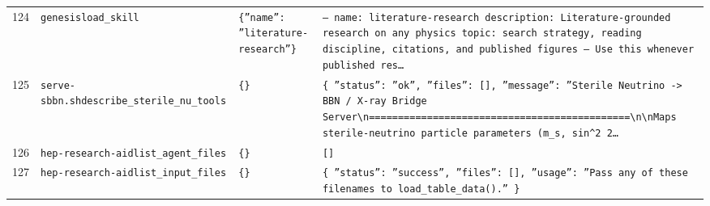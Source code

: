 \documentclass[11pt,a4paper]{article}
\begin{document}
\begin{longtable}{@{}p{}p{}p{}p{}@{}}
124 & \texttt{genesis}\newline\texttt{load\_\allowbreak{}skill} & \texttt{\{''name'':\allowbreak{} ''literature-research''\}\allowbreak{}} & \texttt{--- name:\allowbreak{} literature-research description:\allowbreak{} Literature-grounded research on any physics topic:\allowbreak{} search strategy,\allowbreak{} reading discipline,\allowbreak{} citations,\allowbreak{} and published figures ---  Use this whenever published res\ldots{}\allowbreak{}} \\
125 & \texttt{serve-sbbn.sh}\newline\texttt{describe\_\allowbreak{}sterile\_\allowbreak{}nu\_\allowbreak{}tools} & \texttt{\{\}\allowbreak{}} & \texttt{\{   ''status'':\allowbreak{} ''ok'',\allowbreak{}   ''files'':\allowbreak{} []\allowbreak{},\allowbreak{}   ''message'':\allowbreak{} ''Sterile Neutrino -\textgreater{}\allowbreak{} BBN /\allowbreak{} X-ray Bridge Server\textbackslash{}\allowbreak{}n=\allowbreak{}=\allowbreak{}=\allowbreak{}=\allowbreak{}=\allowbreak{}=\allowbreak{}=\allowbreak{}=\allowbreak{}=\allowbreak{}=\allowbreak{}=\allowbreak{}=\allowbreak{}=\allowbreak{}=\allowbreak{}=\allowbreak{}=\allowbreak{}=\allowbreak{}=\allowbreak{}=\allowbreak{}=\allowbreak{}=\allowbreak{}=\allowbreak{}=\allowbreak{}=\allowbreak{}=\allowbreak{}=\allowbreak{}=\allowbreak{}=\allowbreak{}=\allowbreak{}=\allowbreak{}=\allowbreak{}=\allowbreak{}=\allowbreak{}=\allowbreak{}=\allowbreak{}=\allowbreak{}=\allowbreak{}=\allowbreak{}=\allowbreak{}=\allowbreak{}=\allowbreak{}=\allowbreak{}=\allowbreak{}=\allowbreak{}=\allowbreak{}\textbackslash{}\allowbreak{}n\textbackslash{}\allowbreak{}nMaps sterile-neutrino particle parameters (m\_\allowbreak{}s,\allowbreak{} sin\textasciicircum{}\allowbreak{}2 2\ldots{}\allowbreak{}} \\
126 & \texttt{hep-research-aid}\newline\texttt{list\_\allowbreak{}agent\_\allowbreak{}files} & \texttt{\{\}\allowbreak{}} & \texttt{[]\allowbreak{}} \\
127 & \texttt{hep-research-aid}\newline\texttt{list\_\allowbreak{}input\_\allowbreak{}files} & \texttt{\{\}\allowbreak{}} & \texttt{\{   ''status'':\allowbreak{} ''success'',\allowbreak{}   ''files'':\allowbreak{} []\allowbreak{},\allowbreak{}   ''usage'':\allowbreak{} ''Pass any of these filenames to load\_\allowbreak{}table\_\allowbreak{}data()\allowbreak{}.'' \}\allowbreak{}} \\

\end{longtable}
\end{document}
